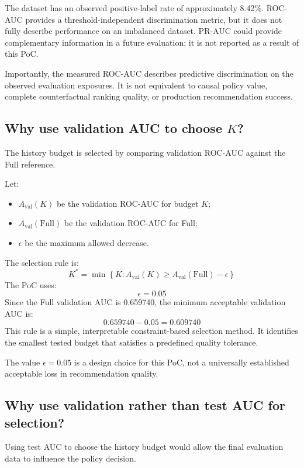 \documentclass[11pt,a4paper]{article}
\begin{document}
The dataset has an observed positive-label rate of approximately 8.42\%. ROC-AUC provides a threshold-independent discrimination metric, but it does not fully describe performance on an imbalanced dataset. PR-AUC could provide complementary information in a future evaluation; it is not reported as a result of this PoC.

Importantly, the measured ROC-AUC describes predictive discrimination on the observed evaluation exposures. It is not equivalent to causal policy value, complete counterfactual ranking quality, or production recommendation success.

\subsection{Why use validation AUC to choose $K$?}
The history budget is selected by comparing validation ROC-AUC against the Full reference.

Let:
\begin{itemize}
    \item $A_{\mathrm{val}}(K)$ be the validation ROC-AUC for budget $K$;
    \item $A_{\mathrm{val}}(\mathrm{Full})$ be the validation ROC-AUC for Full;
    \item $\epsilon$ be the maximum allowed decrease.
\end{itemize}
The selection rule is:
\begin{equation}
K^* = \min \left\{ K : A_{\mathrm{val}}(K) \geq A_{\mathrm{val}}(\mathrm{Full}) - \epsilon \right\}
\end{equation}
The PoC uses:
\begin{equation}
\epsilon = 0.05
\end{equation}
Since the Full validation AUC is 0.659740, the minimum acceptable validation AUC is:
\begin{equation}
0.659740 - 0.05 = 0.609740
\end{equation}
This rule is a simple, interpretable constraint-based selection method. It identifies the smallest tested budget that satisfies a predefined quality tolerance.

The value $\epsilon = 0.05$ is a design choice for this PoC, not a universally established acceptable loss in recommendation quality.

\subsection{Why use validation rather than test AUC for selection?}
Using test AUC to choose the history budget would allow the final evaluation data to influence the policy decision.
\end{document}
